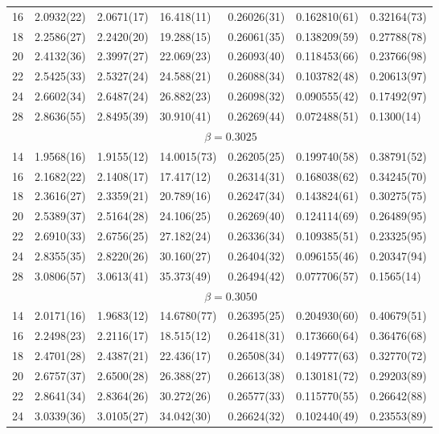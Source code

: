 \documentclass[12pt]{article}
\begin{document}
\begin{table}
\begin{center}
{\begin{tabular}{|l|l|l|l|l|l|l|}
16 & 2.0932(22) & 2.0671(17) & 16.418(11) & 0.26026(31) & 0.162810(61) & 0.32164(73)\\ 
18 & 2.2586(27) & 2.2420(20) & 19.288(15) & 0.26061(35) & 0.138209(59) & 0.27788(78)\\ 
20 & 2.4132(36) & 2.3997(27) & 22.069(23) & 0.26093(40) & 0.118453(66) & 0.23766(98)\\ 
22 & 2.5425(33) & 2.5327(24) & 24.588(21) & 0.26088(34) & 0.103782(48) & 0.20613(97)\\ 
24 & 2.6602(34) & 2.6487(24) & 26.882(23) & 0.26098(32) & 0.090555(42) & 0.17492(97)\\ 
28 & 2.8636(55) & 2.8495(39) & 30.910(41) & 0.26269(44) & 0.072488(51) & 0.1300(14)\\ 
\hline 
  & \multicolumn{6}{|c|}{$ \beta = 0.3025 $} \\ 
 \hline 
14 & 1.9568(16) & 1.9155(12) & 14.0015(73) & 0.26205(25) & 0.199740(58) & 0.38791(52)\\ 
16 & 2.1682(22) & 2.1408(17) & 17.417(12) & 0.26314(31) & 0.168038(62) & 0.34245(70)\\ 
18 & 2.3616(27) & 2.3359(21) & 20.789(16) & 0.26247(34) & 0.143824(61) & 0.30275(75)\\ 
20 & 2.5389(37) & 2.5164(28) & 24.106(25) & 0.26269(40) & 0.124114(69) & 0.26489(95)\\ 
22 & 2.6910(33) & 2.6756(25) & 27.182(24) & 0.26336(34) & 0.109385(51) & 0.23325(95)\\ 
24 & 2.8355(35) & 2.8220(26) & 30.160(27) & 0.26404(32) & 0.096155(46) & 0.20347(94)\\ 
28 & 3.0806(57) & 3.0613(41) & 35.373(49) & 0.26494(42) & 0.077706(57) & 0.1565(14)\\ 
\hline 
  & \multicolumn{6}{|c|}{$ \beta = 0.3050 $} \\ 
 \hline 
14 & 2.0171(16) & 1.9683(12) & 14.6780(77) & 0.26395(25) & 0.204930(60) & 0.40679(51)\\ 
16 & 2.2498(23) & 2.2116(17) & 18.515(12) & 0.26418(31) & 0.173660(64) & 0.36476(68)\\ 
18 & 2.4701(28) & 2.4387(21) & 22.436(17) & 0.26508(34) & 0.149777(63) & 0.32770(72)\\ 
20 & 2.6757(37) & 2.6500(28) & 26.388(27) & 0.26613(38) & 0.130181(72) & 0.29203(89)\\ 
22 & 2.8641(34) & 2.8364(26) & 30.272(26) & 0.26577(33) & 0.115770(55) & 0.26642(88)\\ 
24 & 3.0339(36) & 3.0105(27) & 34.042(30) & 0.26624(32) & 0.102440(49) & 0.23553(89)\\ 

\end{tabular}}
\end{center}
\end{table}
\end{document}
